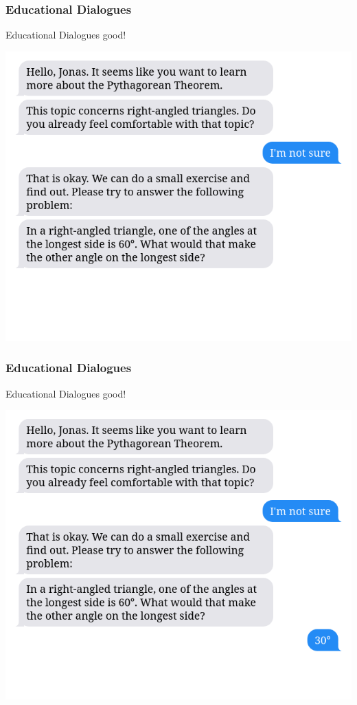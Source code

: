 \documentclass[aspectratio=169, usenames, dvipsnames]{beamer}
\begin{document}
\begin{frame}
\frametitle{Educational Dialogues}
\begin{minipage}{0.4\textwidth}
Educational Dialogues good!
\end{minipage}%
\begin{minipage}{0.6\textwidth}
\includegraphics[height=0.75\textheight,keepaspectratio]{images/bubbles_example_step3} 
\end{minipage}%
\end{frame}

\begin{frame}
\frametitle{Educational Dialogues}
\begin{minipage}{0.4\textwidth}
Educational Dialogues good!
\end{minipage}%
\begin{minipage}{0.6\textwidth}
\includegraphics[height=0.75\textheight,keepaspectratio]{images/bubbles_example_step4} 
\end{minipage}%
\end{frame}
\end{document}
